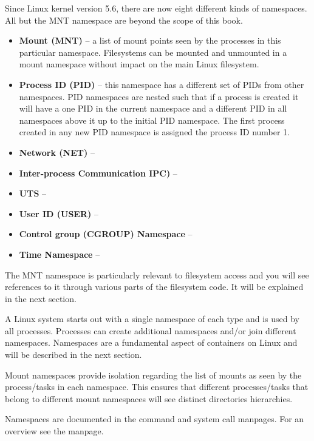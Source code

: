 Since Linux kernel version 5.6, there are now eight different kinds of namespaces. All but the MNT namespace are beyond the scope of this book.

\begin{itemize}
	\item \textbf{Mount (MNT)} -- a  list of mount points seen by the processes in this particular namespace. Filesystems can be 
		mounted and unmounted in a mount namespace without impact on the main Linux filesystem.
	\item \textbf{Process ID (PID)} -- this namespace has a different set of PIDs from other namespaces. PID namespaces 
		are nested such that if a process is created it will have a one PID in the current namespace and a different PID
		in all namespaces above it up to the initial PID namespace. The first process created in any new PID namespace 
		is assigned the process ID number 1.
	\item \textbf{Network (NET)} -- 
	\item \textbf{Inter-process Communication IPC)} -- 
	\item \textbf{UTS} -- 
	\item \textbf{User ID (USER)} -- 
	\item \textbf{Control group (CGROUP) Namespace} -- 
	\item \textbf{Time Namespace} -- 
\end{itemize}

\noindent
The MNT namespace is particularly relevant to filesystem access and you will see references to it through various parts of the filesystem code. It will be explained in the next section.

A Linux system starts out with a single namespace of each type and is used by all processes. Processes can create additional namespaces and/or join different namespaces. Namespaces are a fundamental aspect of containers on Linux and will be described in the next section.

Mount namespaces provide isolation regarding the list of mounts as seen by the process/tasks in each namespace. This ensures that different processes/tasks that belong to different mount namespaces will see distinct directories hierarchies.

Namespaces are documented in the  command and  system call manpages. For an overview see the  manpage.


